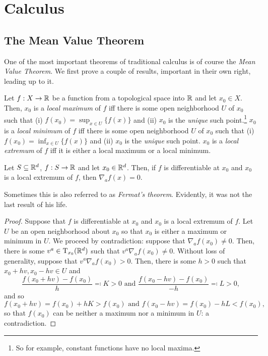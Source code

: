 \section{Calculus}

\subsection{The Mean Value Theorem}

One of the most important theorems of traditional calculus is of course the \emph{Mean Value Theorem}.  We first prove a couple of results, important in their own right, leading up to it.
\begin{dfn}\label{LocalExtrema}
Let $f:X\rightarrow \R$ be a function from a topological space into $\R$ and let $x_0\in X$.  Then, $x_0$ is a \emph{local maximum} of $f$ iff there is some open neighborhood $U$ of $x_0$ such that (i) $f(x_0)=\sup _{x\in U}\{ f(x)\}$ and (ii) $x_0$ is the \emph{unique} such point.\footnote{So for example, constant functions have no local maxima.}  $x_0$ is a \emph{local minimum} of $f$ iff there is some open neighborhood $U$ of $x_0$ such that (i) $f(x_0)=\inf _{x\in U}\{ f(x)\}$ and (ii) $x_0$ is the \emph{unique} such point.  $x_0$ is a \emph{local extremum} of $f$ iff it is either a local maximum or a local minimum.
\end{dfn}
\begin{prp}\label{FirstDerivativeTest}
Let $S\subseteq \R ^d$, $f:S\rightarrow \R$ and let $x_0\in \R ^d$.  Then, if $f$ is differentiable at $x_0$ and $x_0$ is a local extremum of $f$, then $\nabla _af(x)=0$.
\begin{rmk}
Sometimes this is also referred to as \emph{Fermat's theorem}.  Evidently, it was not the last result of his life.
\end{rmk}
\begin{proof}
Suppose that $f$ is differentiable at $x_0$ and $x_0$ is a local extremum of $f$.  Let $U$ be an open neighborhood about $x_0$ so that $x_0$ is either a maximum or minimum in $U$.  We proceed by contradiction:  suppose that $\nabla _af(x_0)\neq 0$.  Then, there is some $v^a\in \tangent{\R ^d}{x_0}$ such that $v^a\nabla _af(x_0)\neq 0$.  Without loss of generality, suppose that $v^a\nabla _af(x_0)>0$.  Then, there is some $h>0$ such that $x_0+hv,x_0-hv\in U$ and
\begin{equation}
\frac{f(x_0+hv)-f(x_0)}{h}\eqqcolon K>0\text{ and }\frac{f(x_0-hv)-f(x_0)}{-h}\eqqcolon L>0,
\end{equation}
and so
\begin{equation}
f(x_0+hv)=f(x_0)+hK>f(x_0)\text{ and }f(x_0-hv)=f(x_0)-hL<f(x_0),
\end{equation}
so that $f(x_0)$ can be neither a maximum nor a minimum in $U$:  a contradiction.
\end{proof}
\end{prp}

